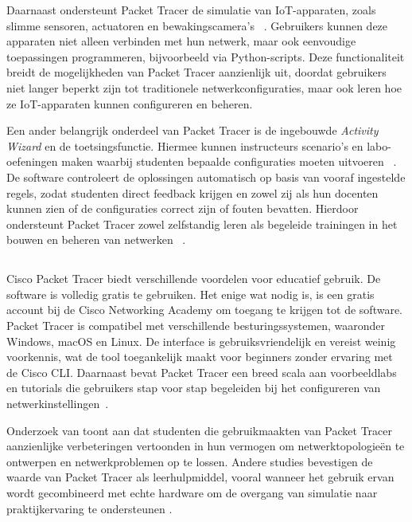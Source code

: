 \vspace{0.3cm}

Daarnaast ondersteunt Packet Tracer de simulatie van IoT-apparaten, zoals slimme sensoren, actuatoren en bewakingscamera’s ~\autocite{thera2020}. Gebruikers kunnen deze apparaten niet alleen verbinden met hun netwerk, maar ook eenvoudige toepassingen programmeren, bijvoorbeeld via Python-scripts. Deze functionaliteit breidt de mogelijkheden van Packet Tracer aanzienlijk uit, doordat gebruikers niet langer beperkt zijn tot traditionele netwerkconfiguraties, maar ook leren hoe ze IoT-apparaten kunnen configureren en beheren.

\vspace{0.3cm}

Een ander belangrijk onderdeel van Packet Tracer is de ingebouwde \textit{Activity Wizard} en de toetsingsfunctie. Hiermee kunnen instructeurs scenario’s en labo-oefeningen maken waarbij studenten bepaalde configuraties moeten uitvoeren ~\autocite{asee_peer_2016}. De software controleert de oplossingen automatisch op basis van vooraf ingestelde regels, zodat studenten direct feedback krijgen en zowel zij als hun docenten kunnen zien of de configuraties correct zijn of fouten bevatten. Hierdoor ondersteunt Packet Tracer zowel zelfstandig leren als begeleide trainingen in het bouwen en beheren van netwerken ~\autocite{asee_peer_2016}.


\subsection{}
\label{sec:Voordelen in het onderwijs}
Cisco Packet Tracer biedt verschillende voordelen voor educatief gebruik. De software is volledig gratis te gebruiken. Het enige wat nodig is, is een gratis account bij de Cisco Networking Academy om toegang te krijgen tot de software. Packet Tracer is compatibel met verschillende besturingssystemen, waaronder Windows, macOS en Linux. De interface is gebruiksvriendelijk en vereist weinig voorkennis, wat de tool toegankelijk maakt voor beginners zonder ervaring met de Cisco CLI. Daarnaast bevat Packet Tracer een breed scala aan voorbeeldlabs en tutorials die gebruikers stap voor stap begeleiden bij het configureren van netwerkinstellingen~\autocite{packetTracerResources2025}.

\vspace{0.3cm}

Onderzoek van \textcite{noor2018} toont aan dat studenten die gebruikmaakten van Packet Tracer aanzienlijke verbeteringen vertoonden in hun vermogen om netwerktopologieën te ontwerpen en netwerkproblemen op te lossen. Andere studies bevestigen de waarde van Packet Tracer als leerhulpmiddel, vooral wanneer het gebruik ervan wordt gecombineerd met echte hardware om de overgang van simulatie naar praktijkervaring te ondersteunen \autocite{runtuwene2024}.

